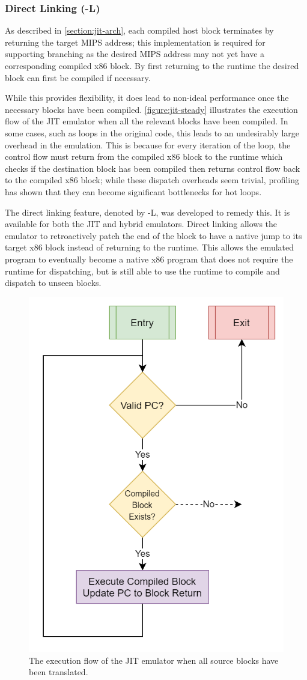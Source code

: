 \subsubsection{Direct Linking (-L)}

As described in \autoref{section:jit-arch}, each compiled host block terminates by returning the target MIPS address; this implementation is required for supporting branching as the desired MIPS address may not yet have a corresponding compiled x86 block. By first returning to the runtime the desired block can first be compiled if necessary.

While this provides flexibility, it does lead to non-ideal performance once the necessary blocks have been compiled. \autoref{figure:jit-steady} illustrates the execution flow of the JIT emulator when all the relevant blocks have been compiled. In some cases, such as loops in the original code, this leads to an undesirably large overhead in the emulation. This is because for every iteration of the loop, the control flow must return from the compiled x86 block to the runtime which checks if the destination block has been compiled then returns control flow back to the compiled x86 block; while these dispatch overheads seem trivial, profiling has shown that they can become significant bottlenecks for hot loops.

The direct linking feature, denoted by -L, was developed to remedy this. It is available for both the JIT and hybrid emulators. Direct linking allows the emulator to retroactively patch the end of the block to have a native jump to its target x86 block instead of returning to the runtime. This allows the emulated program to eventually become a native x86 program that does not require the runtime for dispatching, but is still able to use the runtime to compile and dispatch to unseen blocks.

\begin{figure}[h]
    \centering
    \includegraphics[width=0.5\linewidth]{diagrams/jit-steady.png}
    \caption{The execution flow of the JIT emulator when all source blocks have been translated.}
    \label{figure:jit-steady}
\end{figure}

